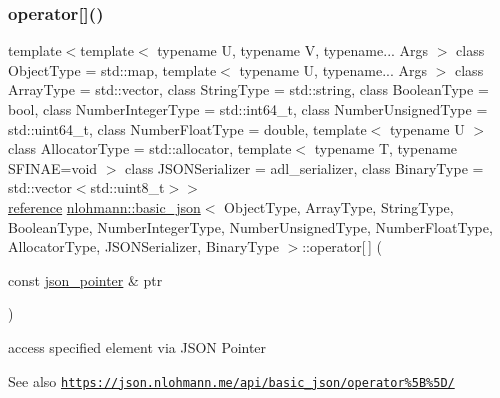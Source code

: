 \subsubsection{\texorpdfstring{operator[]()}{operator[]()}\hspace{0.1cm}{\footnotesize\ttfamily [7/8]}}
{\footnotesize\ttfamily template$<$template$<$ typename U, typename V, typename... Args $>$ class Object\+Type = std\+::map, template$<$ typename U, typename... Args $>$ class Array\+Type = std\+::vector, class String\+Type  = std\+::string, class Boolean\+Type  = bool, class Number\+Integer\+Type  = std\+::int64\+\_\+t, class Number\+Unsigned\+Type  = std\+::uint64\+\_\+t, class Number\+Float\+Type  = double, template$<$ typename U $>$ class Allocator\+Type = std\+::allocator, template$<$ typename T, typename S\+F\+I\+N\+A\+E=void $>$ class J\+S\+O\+N\+Serializer = adl\+\_\+serializer, class Binary\+Type  = std\+::vector$<$std\+::uint8\+\_\+t$>$$>$ \\
\hyperlink{classnlohmann_1_1basic__json_a220ae98554a76205fb7f8822d36b2d5a}{reference} \hyperlink{classnlohmann_1_1basic__json}{nlohmann\+::basic\+\_\+json}$<$ Object\+Type, Array\+Type, String\+Type, Boolean\+Type, Number\+Integer\+Type, Number\+Unsigned\+Type, Number\+Float\+Type, Allocator\+Type, J\+S\+O\+N\+Serializer, Binary\+Type $>$\+::operator\mbox{[}$\,$\mbox{]} (\begin{DoxyParamCaption}\item[{const \hyperlink{classnlohmann_1_1basic__json_aa8f1f93b32da01b42413643be32b2c27}{json\+\_\+pointer} \&}]{ptr }\end{DoxyParamCaption})\hspace{0.3cm}{\ttfamily [inline]}}



access specified element via J\+S\+ON Pointer 

\begin{DoxySeeAlso}{See also}
\href{https://json.nlohmann.me/api/basic_json/operator%5B%5D/}{\tt https\+://json.\+nlohmann.\+me/api/basic\+\_\+json/operator\%5\+B\%5\+D/} 
\end{DoxySeeAlso}
\mbox{\label{classnlohmann_1_1basic__json_a0a691c29eb7c4acd91ccb498a79cd3ee}} 
